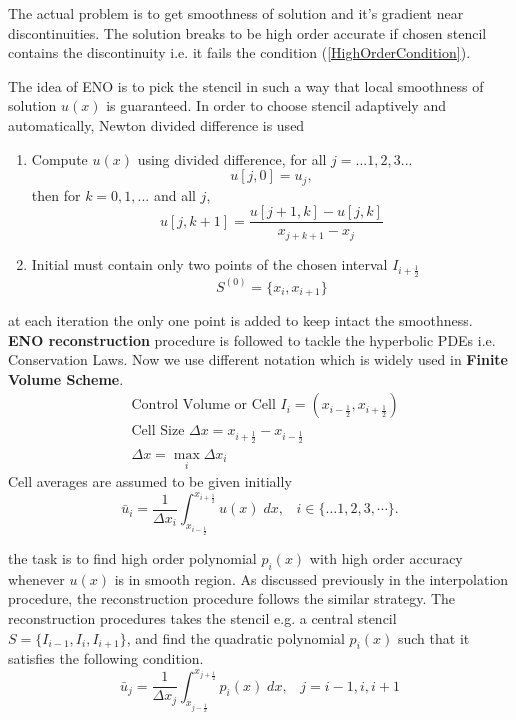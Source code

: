 \documentclass{article}
\begin{document}
\noindent The actual problem is to get smoothness of solution and it's gradient near discontinuities. The solution breaks to be high order accurate if chosen stencil contains the discontinuity i.e. it fails the condition (\ref{HighOrderCondition}).

\noindent The idea of ENO \cite{harten1987uniformly} is to pick the stencil in such a way that local smoothness of solution $u(x)$ is guaranteed. In order to choose stencil adaptively and automatically, Newton divided difference is used

\begin{enumerate}
    \item Compute $u(x)$ using divided difference, for all $j= ...1,2,3...$
    \begin{equation}
        u[j,0] = u_j,
    \end{equation}
    then for $k = 0,1,...$ and all $j$,
    \begin{equation}
        u[j,k+1] = \frac{u[j+1,k] - u[j,k]}{x_{j+k+1} - x_j}
    \end{equation}
    \item Initial must contain only two points of the chosen interval $I_{i+\frac{1}{2}}$
    \begin{equation}
        S^{( 0 )} = \{ x_i,x_{i+1} \}
    \end{equation}
\end{enumerate}
\noindent at each iteration the only one point is added to keep intact the smoothness.\\

\noindent \textbf{ENO reconstruction} procedure is followed to tackle the hyperbolic PDEs i.e. Conservation Laws. Now we use different notation which is widely used in \textbf{Finite Volume Scheme}.
\begin{align}
    &\text{Control Volume or Cell } I_i = (x_{i - \frac{1}{2}},x_{i + \frac{1}{2}})\\
    &\text{Cell Size } \Delta x = x_{i + \frac{1}{2}} - x_{i - \frac{1}{2}}\\
    &  \Delta x =\max_i \Delta x_i
\end{align}
Cell averages are assumed to be given initially
\begin{equation}
     \bar{u}_{i} = \frac{1}{\Delta x_i} \int_{x_{i - \frac{1}{2}}}^{x_{i + \frac{1}{2}}} u(x)\;dx , \;\;\;i \in \{\dots1,2,3,\cdots\}.
\end{equation}

\noindent the task is to find high order polynomial $p_i(x)$ with high order accuracy whenever $u(x)$ is in smooth region. As discussed previously in the interpolation procedure, the reconstruction procedure follows the similar strategy. The reconstruction procedures takes the stencil e.g. a central stencil $S = \{ I_{i-1},I_i, I_{i+1}\}$, and find the quadratic polynomial $p_i(x)$ such that it satisfies the following condition.
\begin{equation}
     \bar{u}_{j} = \frac{1}{\Delta x_j} \int_{x_{j - \frac{1}{2}}}^{x_{j + \frac{1}{2}}} p_i(x)\;dx , \;\;\; j=i-1,i,i+1
\end{equation}
\end{document}
